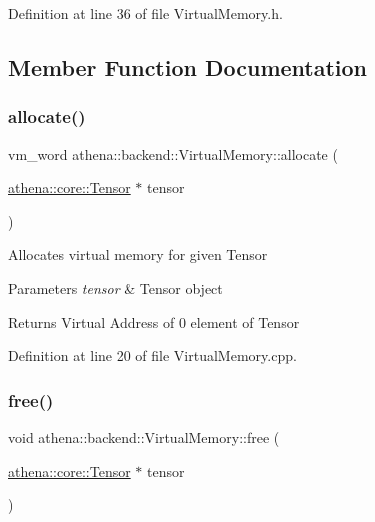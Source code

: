 Definition at line 36 of file Virtual\+Memory.\+h.



\subsection{Member Function Documentation}
\mbox{\label{classathena_1_1backend_1_1_virtual_memory_a22be58a8e0cb574a7d46d4095cb64ac5}} 
\subsubsection{\texorpdfstring{allocate()}{allocate()}}
{\footnotesize\ttfamily vm\+\_\+word athena\+::backend\+::\+Virtual\+Memory\+::allocate (\begin{DoxyParamCaption}\item[{\mbox{\hyperlink{classathena_1_1core_1_1_tensor}{athena\+::core\+::\+Tensor}} $\ast$}]{tensor }\end{DoxyParamCaption})}

Allocates virtual memory for given Tensor 
\begin{DoxyParams}{Parameters}
{\em tensor} & Tensor object \\
\hline
\end{DoxyParams}
\begin{DoxyReturn}{Returns}
Virtual Address of 0 element of Tensor 
\end{DoxyReturn}


Definition at line 20 of file Virtual\+Memory.\+cpp.

\mbox{\label{classathena_1_1backend_1_1_virtual_memory_a73815358c436f8f6dd73d49d4d5d189d}} 
\subsubsection{\texorpdfstring{free()}{free()}\hspace{0.1cm}{\footnotesize\ttfamily [1/2]}}
{\footnotesize\ttfamily void athena\+::backend\+::\+Virtual\+Memory\+::free (\begin{DoxyParamCaption}\item[{\mbox{\hyperlink{classathena_1_1core_1_1_tensor}{athena\+::core\+::\+Tensor}} $\ast$}]{tensor }\end{DoxyParamCaption})}

